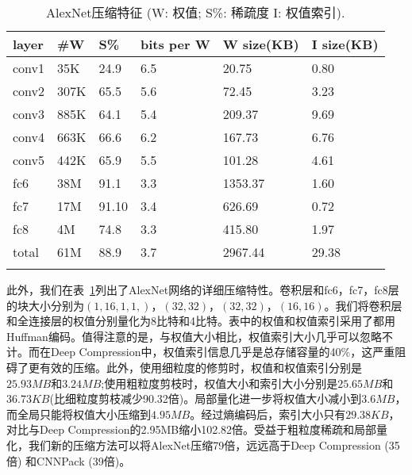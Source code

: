 \begin{table}[h]
\centering
\caption{AlexNet压缩特征 (W: 权值; S\%: 稀疏度 I: 权值索引).}
\begin{tabular}{llllll}
\toprule
layer  	& \#W 	& S\%		& bits per W	& W size(KB)& I size(KB) \\
\midrule
conv1 	& 35K	& 24.9		& 6.5 			& 20.75 	& 0.80 \\
conv2 	& 307K	& 65.5		& 5.6 			& 72.45 	& 3.23 \\
conv3 	& 885K	& 64.1		& 5.4 			& 209.37 	& 9.69 \\
conv4 	& 663K	& 66.6		& 6.2 			& 167.73 	& 6.76 \\
conv5 	& 442K 	& 65.9		& 5.5 			& 101.28 	& 4.61 \\
\midrule
fc6 	& 38M 	& 91.1	& 3.3			& 1353.37	& 1.60 \\
fc7 	& 17M 	& 91.10		& 3.4 			& 626.69 	& 0.72 \\
fc8 	& 4M 	& 74.8		& 3.3 			& 415.80	& 1.97 \\
\midrule
total	& 61M	& 88.9		& 3.7			& 2967.44	& 29.38 \\
\bottomrule
\label{tab:AlexNet}
\end{tabular}
\end{table}

此外，我们在表~\ref{tab:AlexNet}列出了AlexNet网络的详细压缩特性。卷积层和fc6，fc7，fc8层的块大小分别为$(1, 16, 1, 1,)$，$(32, 32)$，$(32, 32)$，$(16,16)$。我们将卷积层和全连接层的权值分别量化为8比特和4比特。表中的权值和权值索引采用了都用Huffman编码。值得注意的是，与权值大小相比，权值索引大小几乎可以忽略不计。而在Deep Compression中，权值索引信息几乎是总存储容量的40\%，这严重阻碍了更有效的压缩。此外，使用细粒度的修剪时，权值和权值索引分别是$25.93MB$和$3.24MB$;使用粗粒度剪枝时，权值大小和索引大小分别是$25.65MB$和$36.73KB$(比细粒度剪枝减少90.32倍)。局部量化进一步将权值大小减小到$3.6MB$，而全局只能将权值大小压缩到$4.95MB$。经过熵编码后，索引大小只有$29.38KB$，对比与Deep Compression的2.95MB缩小102.82倍。受益于粗粒度稀疏和局部量化，我们新的压缩方法可以将AlexNet压缩79倍，远远高于Deep Compression (35倍) 和CNNPack (39倍)。





